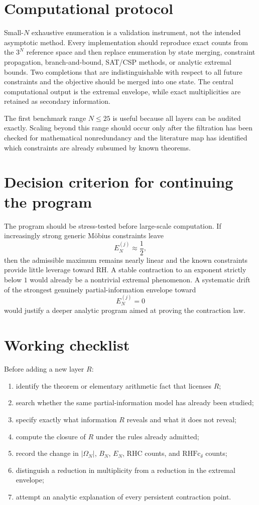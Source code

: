 \documentclass[11pt]{article}
\newcommand{\Om}{\Omega}
\newcommand{\RHFc}{\mathrm{RHFc}}
\begin{document}
\section{Computational protocol}
Small-$N$ exhaustive enumeration is a validation instrument, not the intended asymptotic method.  Every implementation should reproduce exact counts from the $3^N$ reference space and then replace enumeration by state merging, constraint propagation, branch-and-bound, SAT/CSP methods, or analytic extremal bounds.  Two completions that are indistinguishable with respect to all future constraints and the objective should be merged into one state.  The central computational output is the extremal envelope, while exact multiplicities are retained as secondary information.

The first benchmark range $N\le25$ is useful because all layers can be audited exactly.  Scaling beyond this range should occur only after the filtration has been checked for mathematical nonredundancy and the literature map has identified which constraints are already subsumed by known theorems.

\section{Decision criterion for continuing the program}
The program should be stress-tested before large-scale computation.  If increasingly strong generic Möbius constraints leave
\[
 E_N^{(j)}\approx\frac12,
\]
then the admissible maximum remains nearly linear and the known constraints provide little leverage toward RH.  A stable contraction to an exponent strictly below $1$ would already be a nontrivial extremal phenomenon.  A systematic drift of the strongest genuinely partial-information envelope toward
\[
 E_N^{(j)}=0
\]
would justify a deeper analytic program aimed at proving the contraction law.

\section{Working checklist}
Before adding a new layer $R$:
\begin{enumerate}
\item identify the theorem or elementary arithmetic fact that licenses $R$;
\item search whether the same partial-information model has already been studied;
\item specify exactly what information $R$ reveals and what it does not reveal;
\item compute the closure of $R$ under the rules already admitted;
\item record the change in $|\Om_N|$, $B_N$, $E_N$, RHC counts, and $\RHFc_\delta$ counts;
\item distinguish a reduction in multiplicity from a reduction in the extremal envelope;
\item attempt an analytic explanation of every persistent contraction point.
\end{enumerate}
\end{document}
